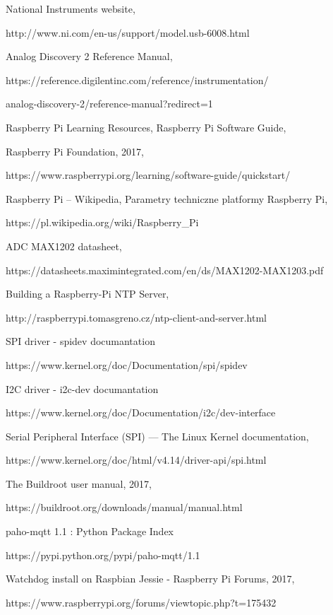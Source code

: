 \begin{thebibliography}{9}


National Instruments website, 

http://www.ni.com/en-us/support/model.usb-6008.html

Analog Discovery 2 Reference Manual, 

https://reference.digilentinc.com/reference/instrumentation/

analog-discovery-2/reference-manual?redirect=1

Raspberry Pi Learning Resources, Raspberry Pi Software Guide, 

Raspberry Pi Foundation, 2017, 

https://www.raspberrypi.org/learning/software-guide/quickstart/

Raspberry Pi – Wikipedia, Parametry techniczne platformy Raspberry Pi,

https://pl.wikipedia.org/wiki/Raspberry\_Pi

ADC MAX1202 datasheet, 

https://datasheets.maximintegrated.com/en/ds/MAX1202-MAX1203.pdf

Building a Raspberry-Pi NTP Server, 

http://raspberrypi.tomasgreno.cz/ntp-client-and-server.html

SPI driver - spidev documantation

https://www.kernel.org/doc/Documentation/spi/spidev

I2C driver - i2c-dev documantation

https://www.kernel.org/doc/Documentation/i2c/dev-interface

Serial Peripheral Interface (SPI) — The Linux Kernel documentation, 

https://www.kernel.org/doc/html/v4.14/driver-api/spi.html

The Buildroot user manual, 2017, 

https://buildroot.org/downloads/manual/manual.html

paho-mqtt 1.1 : Python Package Index

https://pypi.python.org/pypi/paho-mqtt/1.1

Watchdog install on Raspbian Jessie - Raspberry Pi Forums, 2017, 

https://www.raspberrypi.org/forums/viewtopic.php?t=175432


\end{thebibliography}